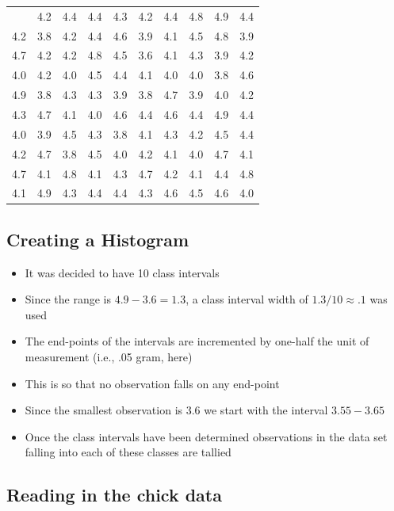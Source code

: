 \documentclass[
  letterpaper,
  DIV=11,
  numbers=noendperiod]{scrartcl}
\begin{document}
\begin{longtable}[]{@{}rrrrrrrrrr@{}}
\toprule\noalign{}
\endhead
\bottomrule\noalign{}
\endlastfoot
3.7 & 4.2 & 4.4 & 4.4 & 4.3 & 4.2 & 4.4 & 4.8 & 4.9 & 4.4 \\
4.2 & 3.8 & 4.2 & 4.4 & 4.6 & 3.9 & 4.1 & 4.5 & 4.8 & 3.9 \\
4.7 & 4.2 & 4.2 & 4.8 & 4.5 & 3.6 & 4.1 & 4.3 & 3.9 & 4.2 \\
4.0 & 4.2 & 4.0 & 4.5 & 4.4 & 4.1 & 4.0 & 4.0 & 3.8 & 4.6 \\
4.9 & 3.8 & 4.3 & 4.3 & 3.9 & 3.8 & 4.7 & 3.9 & 4.0 & 4.2 \\
4.3 & 4.7 & 4.1 & 4.0 & 4.6 & 4.4 & 4.6 & 4.4 & 4.9 & 4.4 \\
4.0 & 3.9 & 4.5 & 4.3 & 3.8 & 4.1 & 4.3 & 4.2 & 4.5 & 4.4 \\
4.2 & 4.7 & 3.8 & 4.5 & 4.0 & 4.2 & 4.1 & 4.0 & 4.7 & 4.1 \\
4.7 & 4.1 & 4.8 & 4.1 & 4.3 & 4.7 & 4.2 & 4.1 & 4.4 & 4.8 \\
4.1 & 4.9 & 4.3 & 4.4 & 4.4 & 4.3 & 4.6 & 4.5 & 4.6 & 4.0 \\
\end{longtable}

\subsection{Creating a Histogram}\label{creating-a-histogram}

\begin{itemize}
\item
  It was decided to have 10 class intervals
\item
  Since the range is \(4.9-3.6=1.3\), a class interval width of
  \(1.3/10  \approx .1\) was used
\item
  The end-points of the intervals are incremented by one-half the unit
  of measurement (i.e., .05 gram, here)
\item
  This is so that no observation falls on any end-point
\item
  Since the smallest observation is 3.6 we start with the interval
  \(3.55-3.65\)
\item
  Once the class intervals have been determined observations in the data
  set falling into each of these classes are tallied
\end{itemize}

\subsection{Reading in the chick data}\label{reading-in-the-chick-data}
\end{document}
